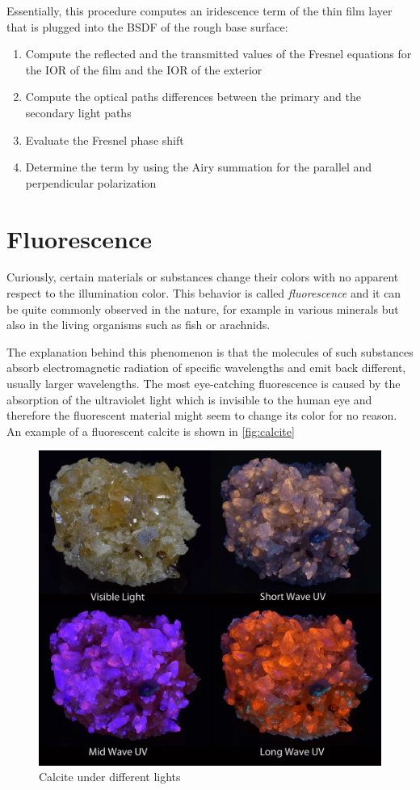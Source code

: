 Essentially, this procedure computes an iridescence term of the thin film layer that is plugged into the BSDF of the rough base surface:

\begin{enumerate}
	\item Compute the reflected and the transmitted values of the Fresnel equations for the IOR of the film and the IOR of the exterior
	\item Compute the optical paths differences between the primary and the secondary light paths
	\item Evaluate the Fresnel phase shift
	\item Determine the term by using the Airy summation for the parallel and perpendicular polarization
\end{enumerate}

\section{Fluorescence}

Curiously, certain materials or substances change their colors with no apparent respect to the illumination color. This behavior is called \emph{fluorescence} and it can be quite commonly observed in the nature, for example in various minerals but also in the living organisms such as fish or arachnids.

The explanation behind this phenomenon is that the molecules of such substances absorb electromagnetic radiation of specific wavelengths and emit back different, usually larger wavelengths. The most eye-catching fluorescence is caused by the absorption of the ultraviolet light which is invisible to the human eye and therefore the fluorescent material might seem to change its color for no reason. An example of a fluorescent calcite is shown in \autoref{fig:calcite}

\begin{figure}
	\centering
	\includegraphics[width=0.8\linewidth]{img/calcite.png}
	\caption[calcite]{Calcite under different lights\footnotemark}
	\label{fig:calcite}
\end{figure}

